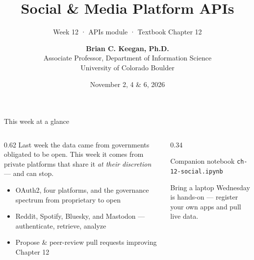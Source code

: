 \documentclass[9pt,aspectratio=169]{beamer}
\title[Week 12 · Social APIs]{{\Huge Social \& Media Platform APIs}}
\subtitle{Week 12 · APIs module · Textbook Chapter 12}
\author[Keegan]{\textbf{Brian C. Keegan, Ph.D.} \\ Associate Professor, Department of Information Science \\ University of Colorado Boulder}
\date{November 2, 4 \& 6, 2026}
\begin{document}
\maketitle

\begin{frame}{This week at a glance}
    \begin{columns}[T]
        \begin{column}{0.62\textwidth}
            Last week the data came from governments obligated to be open. This week it comes from private platforms that share it \textit{at their discretion} --- and can stop.

            \vspace{1em}

            \begin{itemize}\small
                \item OAuth2, four platforms, and the governance spectrum from proprietary to open
            \end{itemize}

            \vspace{0.5em}

            \begin{itemize}\small
                \item Reddit, Spotify, Bluesky, and Mastodon --- authenticate, retrieve, analyze
            \end{itemize}

            \vspace{0.5em}

            \begin{itemize}\small
                \item Propose \& peer-review pull requests improving Chapter 12
            \end{itemize}
        \end{column}
        \begin{column}{0.34\textwidth}
            \begin{block}{Companion notebook}
                \footnotesize \texttt{ch-12-social.ipynb}
            \end{block}
            \begin{alertblock}{Bring a laptop}
                \footnotesize Wednesday is hands-on --- register your own apps and pull live data.
            \end{alertblock}
        \end{column}
    \end{columns}
\end{frame}
\end{document}
